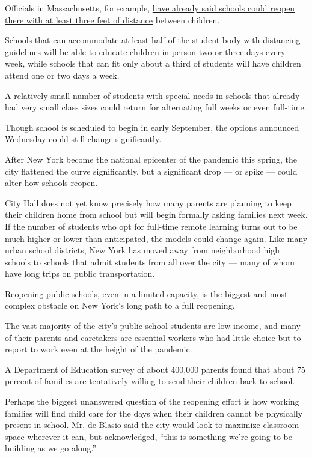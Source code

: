Officials in Massachusetts, for example,
\href{https://www.npr.org/2020/07/02/886845449/massachusetts-education-commissioner-on-states-plan-to-reopen-schools-in-the-fal}{have
already said schools could reopen there with at least three feet of
distance} between children.

Schools that can accommodate at least half of the student body with
distancing guidelines will be able to educate children in person two or
three days every week, while schools that can fit only about a third of
students will have children attend one or two days a week.

A
\href{https://www.nytimes3xbfgragh.onion/2020/04/16/nyregion/special-education-coronavirus-nyc.html}{relatively
small number of students with special needs} in schools that already had
very small class sizes could return for alternating full weeks or even
full-time.

Though school is scheduled to begin in early September, the options
announced Wednesday could still change significantly.

After New York become the national epicenter of the pandemic this
spring, the city flattened the curve significantly, but a significant
drop --- or spike --- could alter how schools reopen.

City Hall does not yet know precisely how many parents are planning to
keep their children home from school but will begin formally asking
families next week. If the number of students who opt for full-time
remote learning turns out to be much higher or lower than anticipated,
the models could change again. Like many urban school districts, New
York has moved away from neighborhood high schools to schools that admit
students from all over the city --- many of whom have long trips on
public transportation.

Reopening public schools, even in a limited capacity, is the biggest and
most complex obstacle on New York's long path to a full reopening.

The vast majority of the city's public school students are low-income,
and many of their parents and caretakers are essential workers who had
little choice but to report to work even at the height of the pandemic.

A Department of Education survey of about 400,000 parents found that
about 75 percent of families are tentatively willing to send their
children back to school.

Perhaps the biggest unanswered question of the reopening effort is how
working families will find child care for the days when their children
cannot be physically present in school. Mr. de Blasio said the city
would look to maximize classroom space wherever it can, but
acknowledged, ``this is something we're going to be building as we go
along.''

